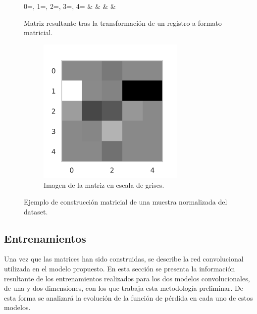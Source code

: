 \documentclass{uathesis-es}
\begin{document}
{\begin{figure}[H]
\begin{subtable}
		{0=\cero, 1=\one, 2=\two, 3=\three, 4=\four}{%
			\cero & \one & \two & \three &  \four
		}
		\captionsetup{singlelinecheck = false, format= hang, justification=centering, font=footnotesize, labelsep=space}
		\caption{Matriz resultante tras la transformación de un registro a formato matricial.}
		\label{ProcesoMatriz:Array}
	\end{subtable}
	\hspace{5em}
	\begin{subfigure}
		\centering
		\includegraphics[scale=0.5]{Figures/TFM/accidente_fatal.png}
		\captionsetup{singlelinecheck = false, format= hang, justification=centering, font=footnotesize, labelsep=space}
		\caption{Imagen de la matriz en escala de grises.}
		\label{ProcesoMatriz:VisualizacionDeMatriz}
	\end{subfigure}
	\caption{Ejemplo de construcción matricial de una muestra normalizada del dataset.}
	\label{ProcesoMatriz}
\end{figure}



\subsection*{Entrenamientos}

Una vez que las matrices han sido construidas, se describe la red convolucional utilizada en el modelo propuesto. En esta sección se presenta la información resultante de los entrenamientos realizados para los dos modelos convolucionales, de una y dos dimensiones, con los que trabaja esta metodología preliminar. De esta forma se analizará la evolución de la función de pérdida en cada uno de estos modelos.

}
\end{document}
